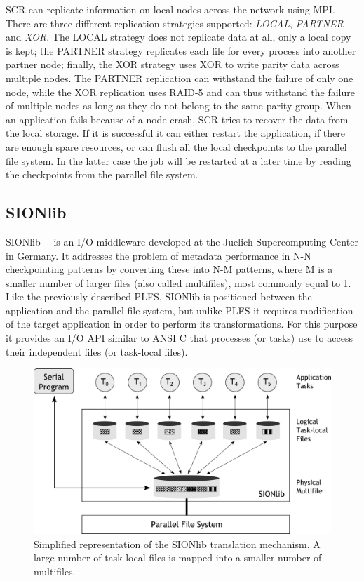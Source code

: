 SCR can replicate information on local nodes across the network using MPI. There are three different replication strategies supported: \textit{LOCAL}, \textit{PARTNER} and \textit{XOR}. The LOCAL strategy does not 
replicate data at all, only a local copy is kept; the PARTNER strategy replicates each file for every process into another partner node; finally, the XOR strategy uses XOR to write parity data across multiple nodes. 
The PARTNER replication can withstand the failure of only one node, while the XOR replication uses RAID-5 and can thus withstand the failure of multiple nodes as long as they do not belong to the same parity group. 
When an application fails because of a node crash, SCR tries to recover the data from the local storage. If it is successful it can either restart the application, if there are enough spare resources, or can flush 
all the local checkpoints to the parallel file system. In the latter case the job will be restarted at a later time by reading the checkpoints from the parallel file system.

\subsection{SIONlib}
SIONlib~\cite{Frings2009}~\cite{Freche2009} is an I/O middleware developed at the Juelich Supercomputing Center in Germany. It addresses the problem of metadata performance in N-N checkpointing patterns by converting 
these into N-M patterns, where M is a smaller number of larger files (also called multifiles), most commonly equal to 1. Like the previously described PLFS, SIONlib is positioned between the application and the parallel 
file system, but unlike PLFS it requires modification of the target application in order to perform its transformations. For this purpose it provides an I/O API similar to ANSI C that processes (or tasks) use to access 
their independent files (or task-local files).

\begin{figure}[!htb]
\centering
\includegraphics[width=\textwidth]{figures/sionlib}
\caption{Simplified representation of the SIONlib translation mechanism. A large number of task-local files is mapped into a smaller number of multifiles.}
\label{figure: sionlib}
\end{figure}

